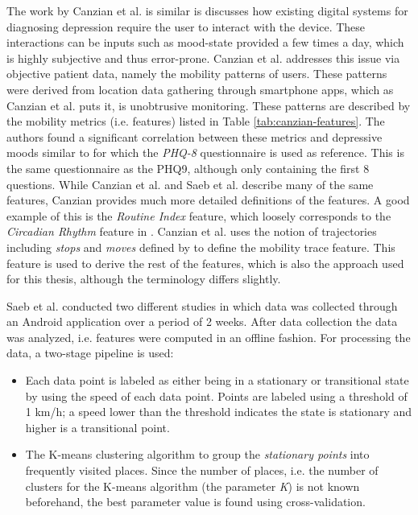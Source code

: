 
The work by Canzian et al. is similar is discusses how existing digital systems for diagnosing depression require the user to interact with the device. These interactions can be inputs such as mood-state provided a few times a day, which is highly subjective and thus error-prone. Canzian et al. addresses this issue via objective patient data, namely the mobility patterns of users. These patterns were derived from location data gathering through smartphone apps, which as Canzian et al. puts it, is unobtrusive monitoring. These patterns are described by the mobility metrics (i.e. features) listed in Table \ref{tab:canzian-features}. The authors found a significant correlation between these metrics and depressive moods similar to \cite{Saeb2015} for which the \textit{PHQ-8} questionnaire is used as  reference. This is the same questionnaire as the PHQ9, although only containing the first 8 questions. While Canzian et al. and Saeb et al. describe many of the same features, Canzian provides much more detailed definitions of the features. A good example of this is the \textit{Routine Index} feature, which loosely corresponds to the \textit{Circadian Rhythm} feature in \cite{Saeb2015}. Canzian et al. \cite{Canzian2015} uses the notion of trajectories including \textit{stops} and \textit{moves} defined by \cite{trajectories2008} to define the mobility trace feature. This feature is used to derive the rest of the features, which is also the approach used for this thesis, although the terminology differs slightly.




Saeb et al. conducted two different studies \cite{Saeb2015, saeb2016} in which data was collected through an Android application over a period of 2 weeks. After data collection the data was analyzed, i.e. features were computed in an offline fashion. For processing the data, a two-stage pipeline is used: 
\begin{itemize}
    \item Each data point is labeled as either being in a stationary or transitional state by using the speed of each data point. Points are labeled using a threshold of 1 km/h; a speed lower than the threshold indicates the state is stationary and higher is a transitional point. 
    \item The K-means clustering algorithm to group the \textit{stationary points} into frequently visited places. Since the number of places, i.e. the number of clusters for the K-means algorithm (the parameter \textit{K}) is not known beforehand, the best parameter value is found using cross-validation.
\end{itemize}

